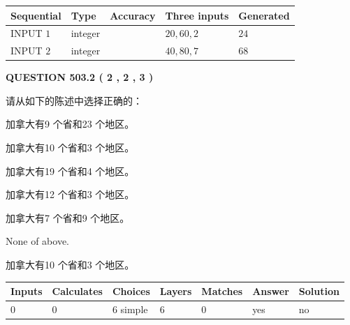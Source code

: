 \documentclass{ctexart}
\begin{document}
   
  
  
\noindent\begin{tabular}{|l|l|l|l|l|}
\hline
 Sequential & Type & Accuracy & Three inputs & Generated \\ 
\hline
 
 
  INPUT $  1 $ & integer &  & $
 20
 , 
 60
 , 
 2
 $ & $ 24 $ 
 \\  \hline  
 
 
  INPUT $  2 $ & integer &  & $
 40
 , 
 80
 , 
 7
 $ & $ 68 $ 
 \\  \hline  
 \end{tabular}
   
   
  
\vspace{0.2in}
  
{\textbf{\Large{QUESTION
503.2 
 ( 2 , 2 , 3 )
}}}
  
  
请从如下的陈述中选择正确的：
 
 
加拿大有9 个省和23 个地区。
 
 
加拿大有10 个省和3 个地区。
 
 
加拿大有19 个省和4 个地区。
 
 
加拿大有12 个省和3 个地区。
 
 
加拿大有7 个省和9 个地区。
 
 
 None of above.
 
 
\noindent{}
 
 
加拿大有10 个省和3 个地区。
 
 
\noindent{}
 
 
   
   
   
   
\noindent\begin{tabular}{|l|l|l|l|l|l|l|}
 \hline
Inputs & Calculates & Choices & Layers & Matches & Answer & Solution \\ \hline
 0  & 
 0  & 
 6
  simple  
  & 
 6  & 
 0  & 
  yes & 
  no 
  \\ \hline
 \end{tabular}
   
   
   
   
\noindent{}
   
\end{document}
